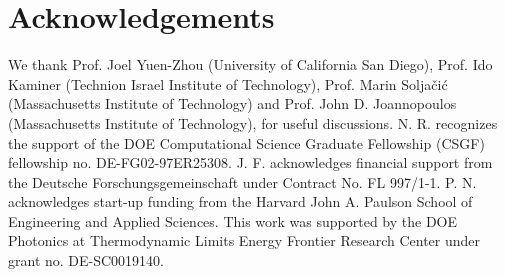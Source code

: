 \documentclass[aps,prl,twocolumn,
	groupedaddress,superscriptaddress,
	amsfonts,amssymb,amsmath,floatfix,
	citeautoscript]{revtex4-1}
\begin{document}



\section{Acknowledgements}
We thank Prof. Joel Yuen-Zhou (University of California San Diego), Prof. Ido Kaminer (Technion Israel Institute of Technology), Prof. Marin Solja\v{c}i\'{c} (Massachusetts Institute of Technology) and Prof. John D. Joannopoulos (Massachusetts Institute of Technology), for useful discussions. N. R. recognizes the support of the DOE Computational Science Graduate Fellowship (CSGF) fellowship no.  DE-FG02-97ER25308. J. F. acknowledges financial support from the Deutsche Forschungsgemeinschaft under Contract No. FL 997/1-1. P. N. acknowledges start-up funding from the Harvard John A. Paulson School of Engineering and Applied Sciences. This work was supported by the DOE Photonics at Thermodynamic Limits Energy Frontier Research Center under grant no. DE-SC0019140.





\end{document}
